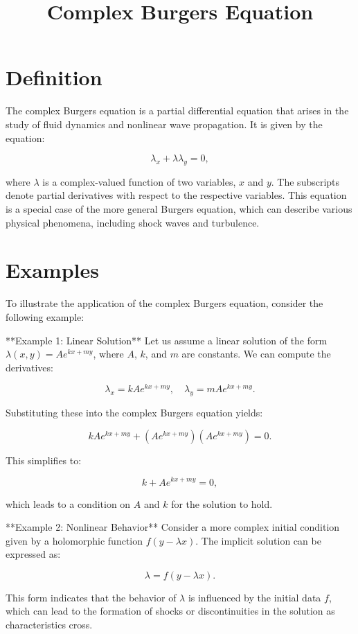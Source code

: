 \documentclass[11pt,a4paper]{article}
\title{Complex Burgers Equation}
\date{}
\begin{document}
\maketitle
\section{Definition}
The complex Burgers equation is a partial differential equation that arises in the study of fluid dynamics and nonlinear wave propagation. It is given by the equation:

\begin{equation}
\lambda_x + \lambda \lambda_y = 0,
\end{equation}

where $\lambda$ is a complex-valued function of two variables, $x$ and $y$. The subscripts denote partial derivatives with respect to the respective variables. This equation is a special case of the more general Burgers equation, which can describe various physical phenomena, including shock waves and turbulence.

\section{Examples}
To illustrate the application of the complex Burgers equation, consider the following example:

**Example 1: Linear Solution**
Let us assume a linear solution of the form $\lambda(x, y) = A e^{kx + my}$, where $A$, $k$, and $m$ are constants. We can compute the derivatives:

\[
\lambda_x = k A e^{kx + my}, \quad \lambda_y = m A e^{kx + my}.
\]

Substituting these into the complex Burgers equation yields:

\[
k A e^{kx + my} + (A e^{kx + my})(A e^{kx + my}) = 0.
\]

This simplifies to:

\[
k + A e^{kx + my} = 0,
\]

which leads to a condition on $A$ and $k$ for the solution to hold.

**Example 2: Nonlinear Behavior**
Consider a more complex initial condition given by a holomorphic function $f(y - \lambda x)$. The implicit solution can be expressed as:

\[
\lambda = f(y - \lambda x).
\]

This form indicates that the behavior of $\lambda$ is influenced by the initial data $f$, which can lead to the formation of shocks or discontinuities in the solution as characteristics cross.
\end{document}
